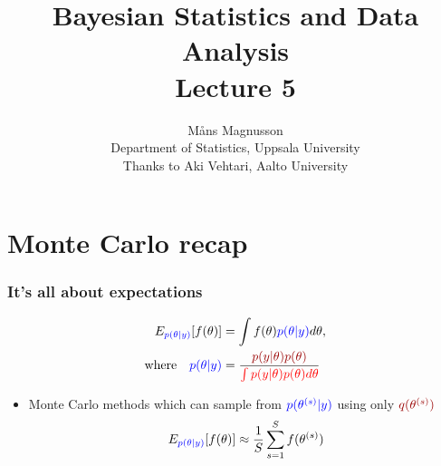 \documentclass[10pt]{beamer}
\title[]{{\color{black}Bayesian Statistics and Data Analysis \\ Lecture 5}}
\author[]{M{\aa}ns Magnusson \\ Department of Statistics, Uppsala University \\ Thanks to Aki Vehtari, Aalto University}
\date{}
\begin{document}
\frame{\titlepage
}






\section{Monte Carlo recap}

\begin{frame}

\frametitle{It's all about expectations}

  \vspace{-1.5\baselineskip}
   \begin{align*}
     E_{\color{blue} p(\theta|y)}[f(\theta)] & = \int f(\theta) {\color{blue} p(\theta|y)} d\theta,\\
     \text{where} \quad
     {\color{blue} p(\theta|y)} & = \frac{\color{uured}p(y|\theta)p(\theta)}{\color{red} \int p(y|\theta)p(\theta) d\theta}
   \end{align*}

 \begin{itemize}
   \vspace{-0.5\baselineskip}
    \item<4-> Monte Carlo methods which can sample from
      ${\color{blue}p(\theta^{(s)}|y)}$ using only
      ${\color{uured}q(\theta^{(s)})}$
         \vspace{-0.5\baselineskip}
      \begin{align*}
        E_{\color{blue} p(\theta|y)}[f(\theta)] \approx \frac{1}{S} \sum_{s=1}^S f(\theta^{(s)})
      \end{align*}
    \end{itemize}

\end{frame}
\end{document}
